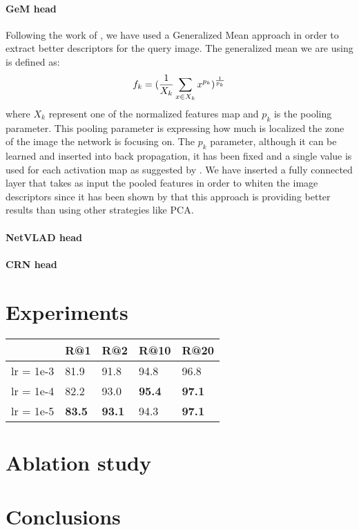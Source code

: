 \documentclass[10pt,twocolumn,letterpaper]{article}
\begin{document}
\paragraph*{GeM head}
Following the work of \cite{GEM}, we have used a Generalized Mean approach in order to extract better 
descriptors for the query image. The generalized mean we are using is defined as:
\begin{equation}
   f_k = ({{1}\over{X_k}} \sum_{x \in X_k} x^{p_k} ) ^ {1\over{p_k}}
\end{equation}
where $X_k $ represent one of the normalized features map and $p_k $ is the pooling parameter. This 
pooling parameter is expressing how much is localized the zone of the image the network is focusing on.
The $p_k $ parameter, although it can be learned and inserted into back propagation, it has been fixed
and a single value is used for each activation map as suggested by \cite{GEM}. We have
inserted a fully connected layer that takes as input the pooled features in order to whiten the image
descriptors since it has been shown by \cite{GEM} that this approach is providing better results than
using other strategies like PCA.
\paragraph*{NetVLAD head}
\paragraph*{CRN head}
\section{Experiments}
 \begin{tabular}{|l|l|l|l|l|}
\hline
          & R@1       &  R@2    & R@10 & R@20      \\
\hline
lr = 1e-3            & 81.9    & 91.8 & 94.8 & 96.8          \\
\hline
lr = 1e-4            & 82.2    & 93.0 & \textbf{95.4} & \textbf{97.1}          \\
\hline
lr = 1e-5            & \textbf{83.5}    & \textbf{93.1} & 94.3 & \textbf{97.1}          \\
\hline
\end{tabular}
\section{Ablation study}
\section{Conclusions}

{\small


}
\end{document}
